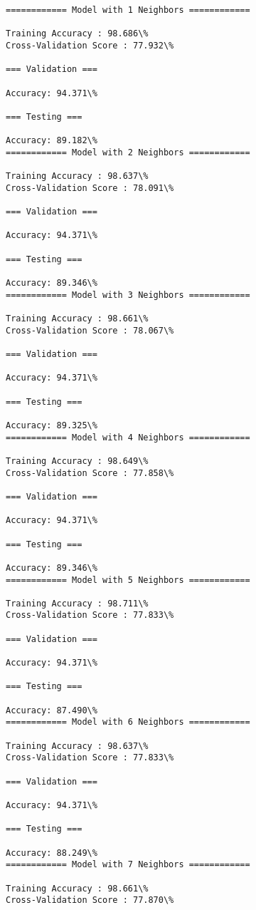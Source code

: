 \documentclass[11pt]{article}
\begin{document}
    \begin{Verbatim}[commandchars=\\\{\}]
============ Model with 1 Neighbors ============

Training Accuracy : 98.686\%
Cross-Validation Score : 77.932\%

=== Validation ===

Accuracy: 94.371\%

=== Testing ===

Accuracy: 89.182\%
============ Model with 2 Neighbors ============

Training Accuracy : 98.637\%
Cross-Validation Score : 78.091\%

=== Validation ===

Accuracy: 94.371\%

=== Testing ===

Accuracy: 89.346\%
============ Model with 3 Neighbors ============

Training Accuracy : 98.661\%
Cross-Validation Score : 78.067\%

=== Validation ===

Accuracy: 94.371\%

=== Testing ===

Accuracy: 89.325\%
============ Model with 4 Neighbors ============

Training Accuracy : 98.649\%
Cross-Validation Score : 77.858\%

=== Validation ===

Accuracy: 94.371\%

=== Testing ===

Accuracy: 89.346\%
============ Model with 5 Neighbors ============

Training Accuracy : 98.711\%
Cross-Validation Score : 77.833\%

=== Validation ===

Accuracy: 94.371\%

=== Testing ===

Accuracy: 87.490\%
============ Model with 6 Neighbors ============

Training Accuracy : 98.637\%
Cross-Validation Score : 77.833\%

=== Validation ===

Accuracy: 94.371\%

=== Testing ===

Accuracy: 88.249\%
============ Model with 7 Neighbors ============

Training Accuracy : 98.661\%
Cross-Validation Score : 77.870\%


\end{Verbatim}
\end{document}
